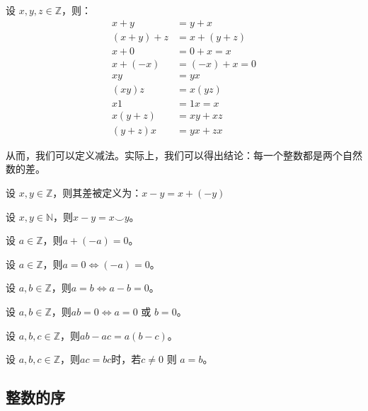 \begin{theorem}[整数的代数运算规则]
	设 $x,y,z\in \mathbb Z$，则：
	$$
	\begin{aligned}
		x+y & = y + x\\
		(x+y)+z & = x + (y+z)\\
		x + 0 & = 0 + x = x\\
		x + (-x) & = (-x) + x = 0\\
		xy & = yx\\
		(xy)z & = x(yz)\\
		x1 & =1x=x\\
		x(y+z) &=xy+xz\\
		(y+z)x & = yx + zx
	\end{aligned}
	$$
\end{theorem}

从而，我们可以定义减法。实际上，我们可以得出结论：每一个整数都是两个自然数的差。

\begin{definition}[减法]
	设 $x, y\in \mathbb Z$，则其差被定义为：$x-y= x+(-y)$
\end{definition}

\begin{theorem}
	设 $x,y\in \mathbb N$，则$x-y=x\smile y$。
\end{theorem}

\begin{theorem}
	设 $a\in \mathbb Z$，则$a + (-a) = 0$。
\end{theorem}

\begin{theorem}
	设 $a\in \mathbb Z$，则$a = 0 \iff (-a) = 0$。
\end{theorem}

\begin{theorem}
	设 $a,b\in \mathbb Z$，则$a=b\iff a-b = 0$。
\end{theorem}

\begin{theorem}
	设 $a,b\in \mathbb Z$，则$ab=0 \iff a = 0$ 或 $b=0$。
\end{theorem}

\begin{theorem}
	设 $a,b, c\in \mathbb Z$，则$ab-ac=a(b-c)$。
\end{theorem}

\begin{theorem}
	设 $a,b, c\in \mathbb Z$，则$ac=bc$时，若$c\ne 0$ 则 $a=b$。
\end{theorem}

\subsection{整数的序}

